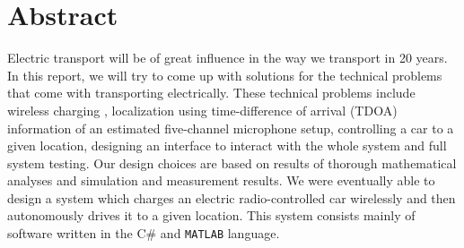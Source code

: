 \documentclass[11pt,titlepage]{report}
\begin{document}
\section*{Abstract}
Electric transport will be of great influence in the way we transport in 20 years. In this report, we will try to come up with solutions for the technical problems that come with transporting electrically. These technical problems include wireless charging , localization using time-difference of arrival (TDOA) information of an estimated five-channel microphone setup, controlling a car to a given location, designing an interface to interact with the whole system and full system testing. Our design choices are based on results of thorough mathematical analyses and simulation and measurement results. We were eventually able to design a system which charges an electric radio-controlled car wirelessly and then autonomously drives it to a given location. This system consists mainly of software written in the C\# and \texttt{MATLAB} language.
\end{document}
